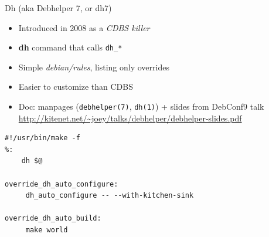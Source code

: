 \documentclass[10pt,final]{beamer}
\begin{document}
\begin{frame}[fragile=singleslide]{Dh (aka Debhelper 7, or dh7)}
  \begin{itemize}
  \item Introduced in 2008 as a \textsl{CDBS killer}
    \hbr
  \item \textbf{dh} command that calls \texttt{dh\_*}
    \hbr
  \item Simple \textsl{debian/rules}, listing only overrides
    \hbr
  \item Easier to customize than CDBS
    \hbr
  \item Doc: manpages (\texttt{debhelper(7)}, \texttt{dh(1)}) + slides from DebConf9 talk\\
    \url{http://kitenet.net/~joey/talks/debhelper/debhelper-slides.pdf}
  \end{itemize}
  \seprule
    \begin{lstlisting}[basicstyle=\ttfamily\footnotesize]
#!/usr/bin/make -f
%:
    dh $@

override_dh_auto_configure:
     dh_auto_configure -- --with-kitchen-sink

override_dh_auto_build:
     make world

    \end{lstlisting}
\end{frame}
\end{document}

